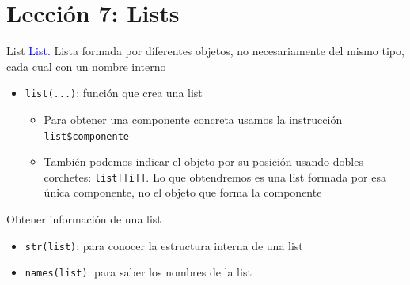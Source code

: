 \documentclass[
  ignorenonframetext,
  aspectratio=169]{beamer}
\providecommand{\tightlist}{%
  \setlength{\itemsep}{0pt}\setlength{\parskip}{0pt}}
\newcommand\blue[1]{\textcolor{blue}{#1}}
\begin{document}
\section{Lección 7: Lists}\label{lecciuxf3n-7-lists}

\begin{frame}[fragile]{List}
\label{list}
\blue{List.} Lista formada por diferentes objetos, no necesariamente del
mismo tipo, cada cual con un nombre interno

\begin{itemize}
\tightlist
\item
  \texttt{list(...)}: función que crea una list

  \begin{itemize}
  \tightlist
  \item
    Para obtener una componente concreta usamos la instrucción
    \texttt{list\$componente}
  \item
    También podemos indicar el objeto por su posición usando dobles
    corchetes: \texttt{list{[}{[}i{]}{]}}. Lo que obtendremos es una
    list formada por esa única componente, no el objeto que forma la
    componente
  \end{itemize}
\end{itemize}
\end{frame}

\begin{frame}[fragile]{Obtener información de una list}
\label{obtener-informaciuxf3n-de-una-list}
\begin{itemize}
\tightlist
\item
  \texttt{str(list)}: para conocer la estructura interna de una list
\item
  \texttt{names(list)}: para saber los nombres de la list
\end{itemize}
\end{frame}
\end{document}
